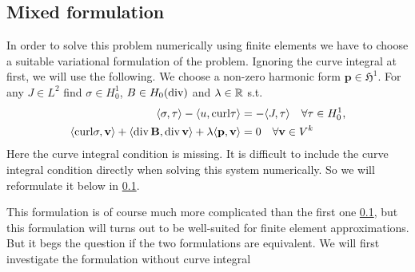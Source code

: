 \documentclass[../master_thesis.tex]{subfiles}
\begin{document}
\subsection{Mixed formulation}
In order to solve this problem numerically using finite elements we have to 
choose a suitable variational formulation of the problem. Ignoring the curve integral 
at first, we will use the following. We choose a non-zero harmonic form 
$\mathbf{p} \in \mathfrak{H}^1$.
For any $J \in L^2$ find $\sigma \in H^1_0$, 
$B \in H_0(\operatorname{div})$ and $\lambda \in \mathbb{R}$ s.t.
\begin{align}
    \langle \sigma, \tau \rangle - \langle u, \mathbf{\operatorname{curl}}\tau \rangle 
        &=  -\langle J, \tau \rangle \quad \forall \tau \in H^1_0, \label{eq:first_eq_mixed_formulation}
    \\ \langle \mathbf{\operatorname{curl}}\sigma, \mathbf{v} \rangle + \langle \operatorname{div} \mathbf{B}, \operatorname{div} \mathbf{v} \rangle 
        + \lambda \langle \mathbf{p}, \mathbf{v} \rangle 
        &= 0 \quad \forall \mathbf{v} \in V^k \label{eq:second_eq_mixed_formulation}
\end{align} 
Here the curve integral condition is missing. It is difficult to include the curve integral 
condition directly when solving this system numerically. So we will reformulate it below 
in \ref{}.

This formulation is of course much more complicated than the first one \ref{}, 
but this formulation will turns out to be well-suited for finite element approximations.
But it begs the question if the two formulations are equivalent. We will first 
investigate the formulation without curve integral
\end{document}
